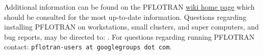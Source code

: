 Additional information can be found on the PFLOTRAN \href{https://bitbucket.org/pflotran/pflotran-dev/wiki/Home}{wiki home page} which should be consulted for the most up-to-date information.
Questions regarding installing PFLOTRAN on workstations, small clusters, and super computers, and bug reports, may be directed to: .
For questions regarding running PFLOTRAN contact: {\footnotesize\tt pflotran-users at googlegroups dot com}.
